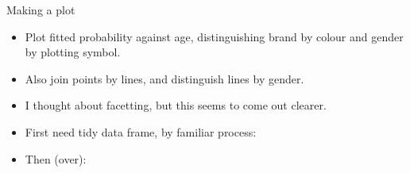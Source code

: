 \begin{frame}[fragile]{Making a plot}
  
  \begin{itemize}
  \item Plot fitted probability against age, distinguishing brand by
    colour and gender by plotting symbol.
  \item Also join points by lines, and distinguish lines by gender. 
  \item I thought about facetting, but this seems to come out clearer.
  \item First need tidy data frame, by familiar process:
    
\begin{knitrout}
\color{fgcolor}
\end{knitrout}
\item Then (over):
  
  \end{itemize}
  
\end{frame}

